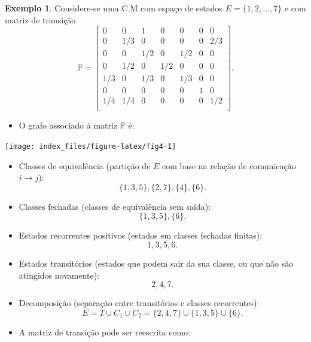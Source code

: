 \documentclass[
  11pt,
  a4paper,
]{book}
\providecommand{\tightlist}{%
  \setlength{\itemsep}{0pt}\setlength{\parskip}{0pt}}
\theoremstyle{definition}
\theoremstyle{definition}
\newtheorem{example}{Exemplo}[chapter]
\theoremstyle{definition}
\theoremstyle{definition}
\theoremstyle{remark}
\begin{document}
\begin{example}
Considere-se uma C.M com espaço de estados \(E=\{1, 2,\dots, 7\}\) e com matriz de transição
\[
\mathbb{P} =
\begin{bmatrix}
0 & 0 & 1 & 0 & 0 & 0 & 0  \\
0 & 1/3 & 0 & 0 & 0 & 0 & 2/3  \\
0 & 0 & 1/2 & 0 & 1/2 & 0 & 0  \\
0 & 1/2 & 0 & 1/2 & 0 & 0 & 0 \\
1/3 & 0 & 1/3 & 0 & 1/3 & 0 & 0  \\
0 & 0 & 0 & 0 & 0 & 1 & 0 \\
1/4 & 1/4 & 0 & 0 & 0 & 0 & 1/2   \\
\end{bmatrix}.
\]

\begin{itemize}
\tightlist
\item
  O grafo associado à matriz \(\mathbb{P}\) é:
\end{itemize}

\begin{center}\texttt{[image: index\_files/figure-latex/fig4-1]} \end{center}

\begin{itemize}
\item
  Classes de equivalência (partição de \(E\) com base na relação de comunicação \(i \longrightarrow j\)):
  \[\{1,3,5\}, \{2,7\}, \{4\}, \{6\}.\]
\item
  Classes fechadas (classes de equivalência sem saída):
  \[\{1,3,5\}, \{6\}.\]
\item
  Estados recorrentes positivos (estados em classes fechadas finitas):
  \[1,3,5,6.\]
\item
  Estados transitórios (estados que podem sair da sua classe, ou que não são atingidos novamente):
  \[2,4,7.\]
\item
  Decomposição (separação entre transitórios e classes recorrentes):
  \[E=T \cup C_1 \cup C_2=\{2,4,7\} \cup \{1,3,5\} \cup \{6\}.\]
\item
  A matriz de transição pode ser reescrita como:
\end{itemize}


\end{example}
\end{document}
